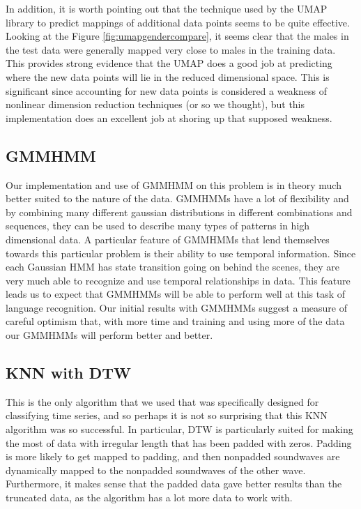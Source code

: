 \documentclass[11pt]{article}
\newcommand{\0}{{\vec  0 }}
\newcommand{\1}{{\mathbbm{  1} }}
\begin{document}
    In addition, it is worth pointing out that the technique used by the UMAP library to predict mappings of additional data points seems to be quite effective. Looking at the Figure \ref{fig:umapgendercompare}, it seems clear that the males in the test data were generally mapped very close to males in the training data. This provides strong evidence that the UMAP does a good job at predicting where the new data points will lie in the reduced dimensional space. This is significant since accounting for new data points is considered a weakness of nonlinear dimension reduction techniques (or so we thought), but this implementation does an excellent job at shoring up that supposed weakness. 
    
    \subsection{GMMHMM}
    Our implementation and use of GMMHMM on this problem is in theory much better suited to the nature of the data. GMMHMMs have a lot of flexibility and by combining many different gaussian distributions in different combinations and sequences, they can be used to describe many types of patterns in high dimensional data. A particular feature of GMMHMMs that lend themselves towards this particular problem is their ability to use temporal information. Since each Gaussian HMM has state transition going on behind the scenes, they are very much able to recognize and use temporal relationships in data. This feature leads us to expect that GMMHMMs will be able to perform well at this task of language recognition. 
    Our initial results with GMMHMMs suggest a measure of careful optimism that, with more time and training and using more of the data our GMMHMMs will perform better and better. 
    
    \subsection{KNN with DTW}
    This is the only algorithm that we used that was specifically designed for classifying time series, and so perhaps it is not so surprising that this KNN algorithm was so successful. In particular, DTW is particularly suited for making the most of data with irregular length that has been padded with zeros. Padding is more likely to get mapped to padding, and then nonpadded soundwaves are dynamically mapped to the nonpadded soundwaves of the other wave. Furthermore, it makes sense that the padded data gave better results than the truncated data, as the algorithm has a lot more data to work with.  
    
\end{document}
